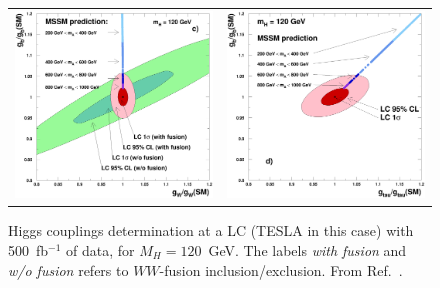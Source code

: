 \documentclass[prd,preprint,aps,floats,superscriptaddress,floatfix,nofootinbib]{revtex4}
\begin{document}
\begin{figure}
\begin{tabular}{cc}
\begin{minipage}{0.5\linewidth}
{\includegraphics[scale=0.4]{fig2206c}}
\end{minipage} &
\begin{minipage}{0.5\linewidth}
{\includegraphics[scale=0.4]{fig2206d}}
\end{minipage}
\end{tabular}
\caption[]{Higgs couplings determination at a LC (TESLA in this case) with 500~fb$^{-1}$ of
data, for $M_H\!=\!120$~GeV. The labels \emph{with fusion} and
\emph{w/o fusion} refers to $WW$-fusion inclusion/exclusion. From
Ref.~\cite{Aguilar-Saavedra:2001rg}. \label{fig:higgs_couplings_lc}}
\end{figure}
\end{document}
